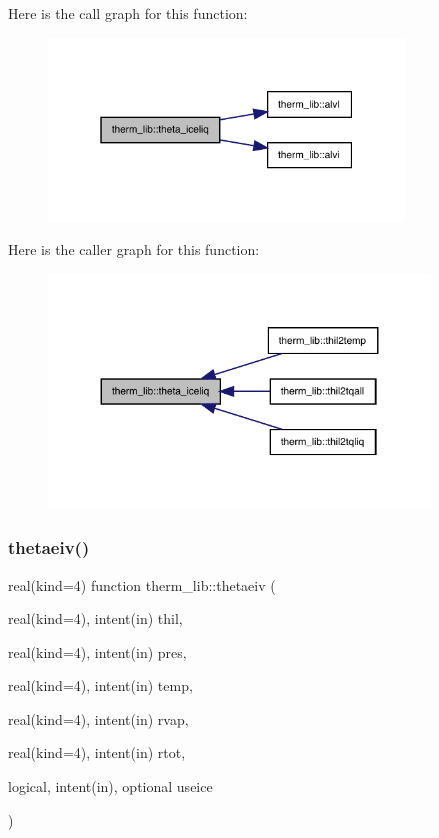 Here is the call graph for this function\+:
\nopagebreak
\begin{figure}[H]
\begin{center}
\leavevmode
\includegraphics[width=268pt]{namespacetherm__lib_a15a79fc7dd2aaabe7bc7da287e531324_cgraph}
\end{center}
\end{figure}
Here is the caller graph for this function\+:
\nopagebreak
\begin{figure}[H]
\begin{center}
\leavevmode
\includegraphics[width=287pt]{namespacetherm__lib_a15a79fc7dd2aaabe7bc7da287e531324_icgraph}
\end{center}
\end{figure}
\mbox{\label{namespacetherm__lib_a2523d158beee975faaed4552724aae65}} 
\subsubsection{\texorpdfstring{thetaeiv()}{thetaeiv()}}
{\footnotesize\ttfamily real(kind=4) function therm\+\_\+lib\+::thetaeiv (\begin{DoxyParamCaption}\item[{real(kind=4), intent(in)}]{thil,  }\item[{real(kind=4), intent(in)}]{pres,  }\item[{real(kind=4), intent(in)}]{temp,  }\item[{real(kind=4), intent(in)}]{rvap,  }\item[{real(kind=4), intent(in)}]{rtot,  }\item[{logical, intent(in), optional}]{useice }\end{DoxyParamCaption})}

